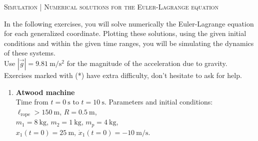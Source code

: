 \documentclass[11pt, a4paper, twoside]{article}
\begin{document}
\begin{center}
  \textsc{\large Simulation | Numerical solutions for the Euler-Lagrange equation}
\end{center}

\noindent
In the following exercises, you will solve numerically the Euler-Lagrange equation for each generalized coordinate. Plotting these solutions, using the given initial conditions and within the given time ranges, you will be simulating the dynamics of these systems.\\
Use \(|\vec{g}| = \SI{9.81}{\metre\per\second\squared}\) for the magnitude of the acceleration due to gravity.\\
Exercises marked with (*) have extra difficulty, don't hesitate to ask for help.


\begin{enumerate}


\item 
\begin{minipage}[t][2.5cm]{0.7\textwidth}
\textbf{Atwood machine}\\
Time from \(t = \SI{0}{\second}\) to \(t = \SI{10}{\second}\).
Parameters and initial conditions:\\
\(\ell_\mathrm{rope} > \SI{150}{\metre}\), 
\(R = \SI{0.5}{\metre}\), \\ 
\(m_1 = \SI{8}{\kilo\gram}\), 
\(m_2 = \SI{1}{\kilo\gram}\), 
\(m_p = \SI{4}{\kilo\gram}\), \\
\(x_1(t=0) = \SI{25}{\metre}\), 
\(\dot{x}_1(t=0) = -\SI{10}{\metre\per\second}\).
\end{minipage}
\begin{minipage}[c][2cm][t]{0.3\textwidth}
	
\end{minipage}


\end{enumerate}
\end{document}
